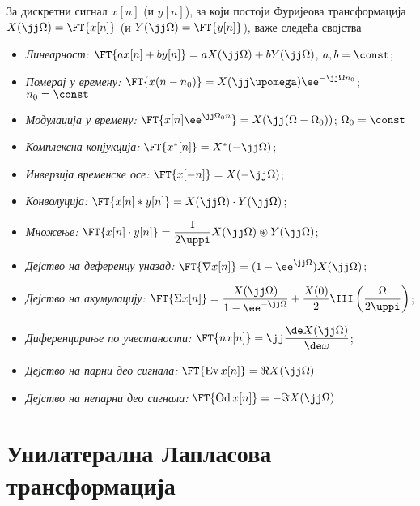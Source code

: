 За дискретни сигнал $x[n]$ (и $y[n]$), за који постоји Фуријеова трансформација
$X(\jj\Omega) = \FT{x[n]}$ (и $Y(\jj\Omega) = \FT{y[n]}$), важе следећа својства
\begin{itemize}
    \item \emph{Линеарност:} $\FT{ax[n] + by[n]} = a X(\jj\Omega) + b Y(\jj\Omega)$, \qquad $a,b = \const$; \hfill \Svojstvo
    \item \emph{Померај у времену:} $\FT{x(n-n_0)} = X(\jj\upomega) \ee^{-\jj\Omega n_0}$; \qquad $n_0 = \const$ \hfill \Svojstvo
    \item \emph{Модулација у времену:} $\FT{x[n] \ee^{\jj\Omega_0 n}} = X(\jj(\Omega - \Omega_0))$; \qquad $\Omega_0 = \const$ \hfill \Svojstvo
    \item \emph{Комплексна конјукција:} $\FT{x^{\ast}[n] } = X^{\ast}(-\jj\Omega)$;  \hfill \Svojstvo
    \item \emph{Инверзија временске осе:} $\FT{x[-n] } = X(-\jj\Omega)$; \hfill \Svojstvo
    \item \emph{Конволуција:} $\FT{x[n] \ast y[n]} = X(\jj\Omega) \cdot Y(\jj\Omega)$; \hfill \Svojstvo
    \item \emph{Множење:} $\FT{x[n] \cdot y[n]} = \dfrac{1}{2\uppi} X(\jj\Omega) \circledast Y(\jj\Omega)$; \hfill \Svojstvo
    \item \emph{Дејство на деференцу уназад:} $ \FT{ \nabla x[n] } = (1 - \ee^{\jj\Omega}) X(\jj\Omega) $;\hfill \Svojstvo
    \item \emph{Дејство на акумулацију:} $ \FT{\Sigma x[n]} =  
    \dfrac{X(\jj\Omega)}{1 - \ee^{-\jj\Omega}} + \dfrac{X(0)}{2} \III\left(
        \dfrac{\Omega}{2\uppi}
    \right) 
    $; \hfill \Svojstvo
    \item \emph{Диференцирање по учестаности:} 
    $
    \FT{ n x[n] } = \jj \dfrac{\de X(\jj\Omega)}{\de \omega}
    $; \hfill \Svojstvo
    \item \emph{Дејство на парни део сигнала:}
    $
    \FT{ \operatorname{Ev}x[n]} = \Re{X(\jj\Omega)}
    $ \hfill \Svojstvo
    \item \emph{Дејство на непарни део сигнала:}
    $
    \FT{ \operatorname{Od}x[n]} = -\Im{X(\jj\Omega)}
    $ \hfill \Svojstvo
    
\end{itemize} 


\section*{Унилатерална Лапласова трансформација}

